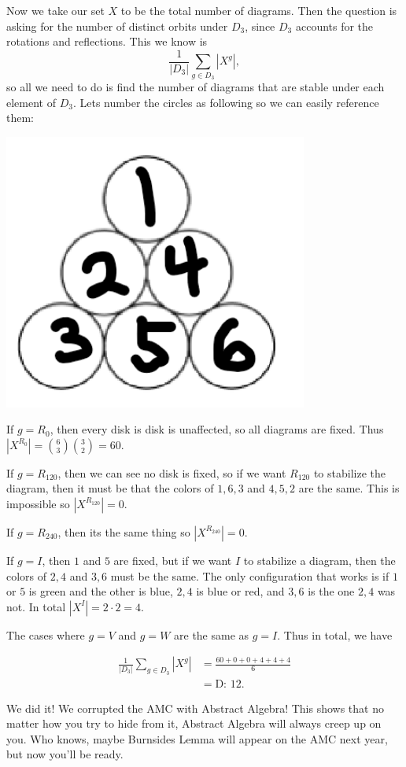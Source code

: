 \documentclass{article}
\begin{document}
Now we take our set $X$ to be the total number of diagrams. Then the question is asking for the number of distinct orbits under $D_3$, since $D_3$ accounts for the rotations and reflections. This we know is 
$$\frac{1}{|D_3|}\sum_{g\in D_3}|X^g|,$$
so all we need to do is find the number of diagrams that are stable under each element of $D_3$. Lets number the circles as following so we can easily reference them:
\begin{center}
    \includegraphics[width=10cm, scale=1.5]{nov23/images/modifiedamcimage.png}
\end{center}
If $g=R_0$, then every disk is disk is unaffected, so all diagrams are fixed. Thus $|X^{R_0}|=\binom{6}{3}\binom{3}{2}=60$. 

If $g=R_{120}$, then we can see no disk is fixed, so if we want $R_{120}$ to stabilize the diagram, then it must be that the colors of $1,6,3$ and $4,5,2$ are the same. This is impossible so $|X^{R_{120}}|=0$.

If $g=R_{240}$, then its the same thing so $|X^{R_{240}}|=0$.

If $g=I$, then $1$ and $5$ are fixed, but if we want $I$ to stabilize a diagram, then the colors of $2,4$ and $3,6$ must be the same. The only configuration that works is if $1$ or $5$ is green and the other is blue, $2,4$ is blue or red, and $3,6$ is the one $2,4$ was not. In total $|X^{I}| = 2\cdot 2 =4.$

The cases where $g=V$ and $g=W$ are the same as $g=I$. Thus in total, we have

\begin{align*}
    \frac{1}{|D_3|}\sum_{g\in D_3}|X^g| &= \frac{60+0+0+4+4+4}{6}\\
    &=\boxed{\text{D: }12}.
\end{align*}

We did it! We corrupted the AMC with Abstract Algebra! This shows that no matter how you try to hide from it, Abstract Algebra will always creep up on you. Who knows, maybe Burnsides Lemma will appear on the AMC next year, but now you'll be ready.
\end{document}
